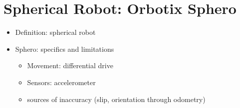 \section{Spherical Robot: Orbotix Sphero}
\begin{itemize}
	\item{Definition: spherical robot}
	\item{Sphero: specifics and limitations}
	\begin{itemize}
		\item{Movement: differential drive}
		\item{Sensors: accelerometer}
		\item{sources of inaccuracy (slip, orientation through odometry)}
	\end{itemize}
\end{itemize}
	